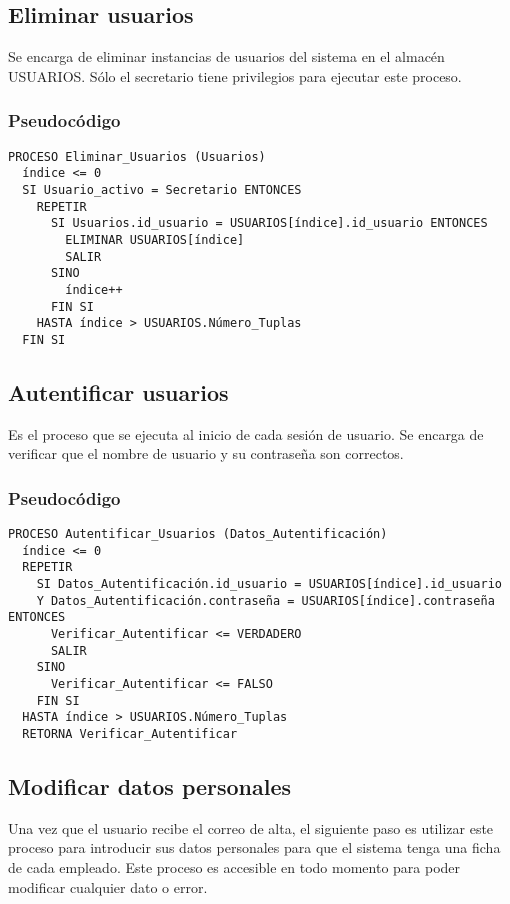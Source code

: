 \documentclass[12pt,a4paper,spanish,twoside]{book}
\begin{document}
\subsection{Eliminar usuarios}
Se encarga de eliminar instancias de usuarios del sistema en el almacén 
USUARIOS. Sólo el secretario tiene privilegios para ejecutar este proceso. 

\subsubsection{Pseudocódigo}
\begin{lstlisting}[inputencoding=utf8/latin1]
PROCESO Eliminar_Usuarios (Usuarios)
  índice <= 0
  SI Usuario_activo = Secretario ENTONCES
    REPETIR
      SI Usuarios.id_usuario = USUARIOS[índice].id_usuario ENTONCES
        ELIMINAR USUARIOS[índice]
        SALIR
      SINO
        índice++
      FIN SI
    HASTA índice > USUARIOS.Número_Tuplas
  FIN SI
\end{lstlisting}

\subsection{Autentificar usuarios}
Es el proceso que se ejecuta al inicio de cada sesión de usuario. Se encarga
de verificar que el nombre de usuario y su contraseña son correctos.

\subsubsection{Pseudocódigo}
\begin{lstlisting}[inputencoding=utf8/latin1]
PROCESO Autentificar_Usuarios (Datos_Autentificación)
  índice <= 0
  REPETIR
    SI Datos_Autentificación.id_usuario = USUARIOS[índice].id_usuario
    Y Datos_Autentificación.contraseña = USUARIOS[índice].contraseña ENTONCES
      Verificar_Autentificar <= VERDADERO
      SALIR
    SINO
      Verificar_Autentificar <= FALSO
    FIN SI
  HASTA índice > USUARIOS.Número_Tuplas
  RETORNA Verificar_Autentificar
\end{lstlisting}

\subsection{Modificar datos personales}
Una vez que el usuario recibe el correo de alta, el siguiente paso es
utilizar este proceso para introducir sus datos personales para que el
sistema tenga una ficha de cada empleado. Este proceso es accesible en todo
momento para poder modificar cualquier dato o error.
\end{document}
